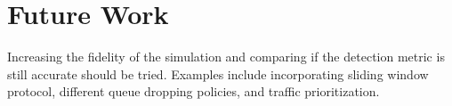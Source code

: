 \documentclass{article}
\begin{document}
\section{Future Work}

Increasing the fidelity of the simulation and comparing if the detection metric is still accurate should be tried. Examples include incorporating sliding window protocol, different queue dropping policies, and traffic prioritization.





\end{document}
